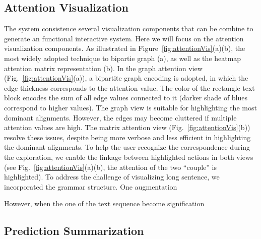 \subsection{Attention Visualization}
The system consistence several visualization components that can be combine to generate an functional interactive system. Here we will focus on the attention visualization components. 
As illustrated in Figure~\ref{fig:attentionVis}(a)(b), the most widely adopted technique to bipartie graph (a), as well as the heatmap attention matrix representation (b). 
%
In the graph attention view (Fig.~\ref{fig:attentionVis}(a)), a bipartite graph encoding is adopted, in which the edge thickness corresponds to the attention value. The color of the rectangle text block encodes the sum of all edge values connected to it (darker shade of blues correspond to higher values).
The graph view is suitable for highlighting the most dominant alignments. However, the edges may become cluttered if multiple attention values are high. The matrix attention view (Fig.~\ref{fig:attentionVis}(b)) resolve these issues, despite being more verbose and less efficient in highlighting the dominant alignments. 
To help the user recognize the correspondence during the exploration, we enable the linkage between highlighted actions in both views (see Fig.~\ref{fig:attentionVis}(a)(b), the attention of the two ``couple'' is highlighted).
%
To address the challenge of visualizing long sentence, we incorporated the grammar structure.
One augmentation 

However, when the one of the text sequence become signification 





\subsection{Prediction Summarization}


